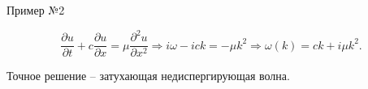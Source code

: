 \documentclass[10pt,xcolor=pst,aspectratio=169]{beamer}
\begin{document}
\begin{frame}{Пример №2}

	\transdissolve[duration=0.1]
	\justifying
	\large

	\[
		\frac{\partial u}{\partial t} + c \frac{\partial u}{\partial x} = \mu \frac{\partial^{2} u}{\partial x^{2}} \Rightarrow i \omega - i c k = - \mu k^{2} \Rightarrow \omega(k) = c k + i \mu k^{2}.
	\]
	
	Точное решение -- затухающая недиспергирующая волна.

\end{frame}
\end{document}
